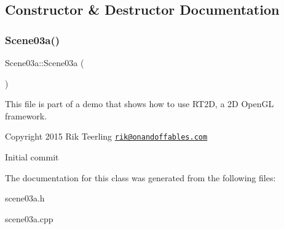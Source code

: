 \subsection{Constructor \& Destructor Documentation}
\mbox{\label{class_scene03a_a51e76ff839b9e5aa276aee0a5ca1b137}} 
\subsubsection{\texorpdfstring{Scene03a()}{Scene03a()}}
{\footnotesize\ttfamily Scene03a\+::\+Scene03a (\begin{DoxyParamCaption}{ }\end{DoxyParamCaption})}

This file is part of a demo that shows how to use R\+T2D, a 2D Open\+GL framework.


\begin{DoxyItemize}
\item Copyright 2015 Rik Teerling \href{mailto:rik@onandoffables.com}{\tt rik@onandoffables.\+com}
\begin{DoxyItemize}
\item Initial commit 
\end{DoxyItemize}
\end{DoxyItemize}

The documentation for this class was generated from the following files\+:\begin{DoxyCompactItemize}
\item 
scene03a.\+h\item 
scene03a.\+cpp\end{DoxyCompactItemize}
